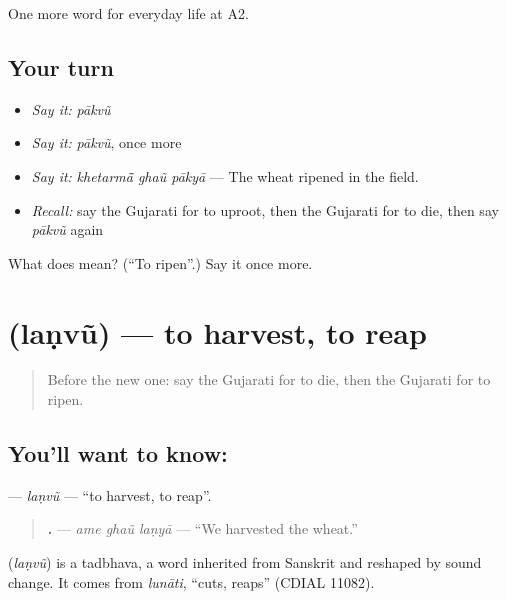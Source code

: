 \begin{grammarlens}[title={What you've built}]
One more word for everyday life at A2.
\end{grammarlens}

\subsection*{Your turn}
\begin{itemize}
\raggedright
  \item \emph{Say it:} \emph{pākvũ}
  \item \emph{Say it:} \emph{pākvũ}, once more
  \item \emph{Say it:} \emph{khetarmā̃ ghaũ pākyā} — The wheat ripened in the field.
  \item \emph{Recall:} say the Gujarati for to uproot, then the Gujarati for to die, then say \emph{pākvũ} again
\end{itemize}

\begin{tcolorbox}[breakable,colback=teal!4,colframe=teal!35!black,title={Before you move on}]
What does  mean? (\textquotedblleft{}To ripen\textquotedblright{}.) Say it once more.
\end{tcolorbox}
\section[\texorpdfstring{\gu{લણવું} (laṇvũ)}{લણવું (laṇvũ)}]{ (laṇvũ) — to harvest, to reap}

\label{lesson:GU-C242-lanvu}



\begin{quote}
Before the new one: say the Gujarati for to die, then the Gujarati for to ripen.
\end{quote}

\subsection*{You'll want to know: }
\textbf{} — \emph{laṇvũ} — \textquotedblleft{}to harvest, to reap\textquotedblright{}.

\begin{quote}
\textbf{  .} — \emph{ame ghaũ laṇyā} — \textquotedblleft{}We harvested the wheat.\textquotedblright{}
\end{quote}

\begin{cousinweb}
\textbf{} (\emph{laṇvũ}) is a tadbhava, a word inherited from Sanskrit and reshaped by sound change. It comes from \emph{lunāti}, \textquotedblleft{}cuts, reaps\textquotedblright{} (CDIAL 11082).
\end{cousinweb}

